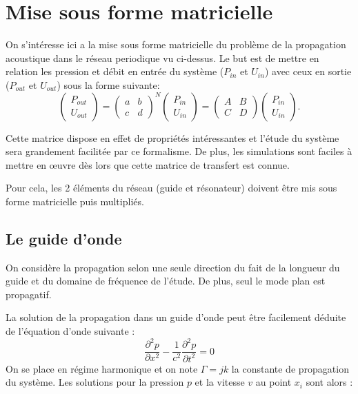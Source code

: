 \section{Mise sous forme matricielle}
On s’intéresse ici a la mise sous forme matricielle du problème de la propagation acoustique dans le réseau periodique vu ci-dessus. Le but est de mettre en relation les pression et débit en entrée du système ($P_{in}$ et $U_{in}$) avec ceux en sortie ($P_{out}$ et $U_{out}$) sous la forme suivante:
\begin{equation}
\begin{pmatrix} P_{out} \\ U_{out} \end{pmatrix} =\begin{pmatrix} a & b \\ c & d \end{pmatrix}^N \begin{pmatrix} P_{in} \\ U_{in} \end{pmatrix} = \begin{pmatrix} A & B \\ C & D \end{pmatrix} \begin{pmatrix} P_{in} \\ U_{in} \end{pmatrix} .
\end{equation}

Cette matrice dispose en effet de propriétés intéressantes et l'étude du système sera grandement facilitée par ce formalisme. De plus, les simulations sont faciles à mettre en œuvre dès lors que cette matrice de transfert est connue.

Pour cela, les 2 éléments du réseau (guide et résonateur) doivent être mis sous forme matricielle puis multipliés.

\subsection{Le guide d'onde}
On considère la propagation selon une seule direction du fait de la longueur du guide et du domaine de fréquence de l'étude. De plus, seul le mode plan est propagatif. 

La solution de la propagation dans un guide d'onde peut être facilement déduite de l'équation d'onde suivante :
\begin{equation}
\frac{\partial ^2 p}{\partial x^2} -\frac{1}{c^{2}} \frac{\partial ^2 p}{\partial t^2}= 0
\end{equation}
On se place en régime harmonique et on note $\Gamma = jk$ la constante de propagation du système. Les solutions pour la pression $p$ et la vitesse $v$ au point $x_{i}$ sont alors :

